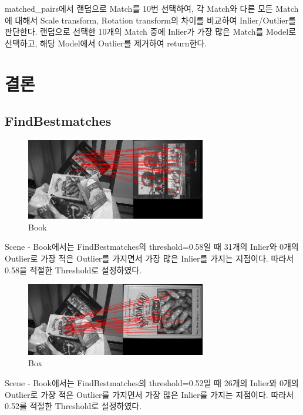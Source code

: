 \documentclass[]{report}
\begin{document}
matched\_pairs에서 랜덤으로 Match를 10번 선택하여,
각 Match와 다른 모든 Match에 대해서 Scale transform, Rotation transform의 차이를 비교하여 Inlier/Outlier를 판단한다.
랜덤으로 선택한 10개의 Match 중에 Inlier가 가장 많은 Match를 Model로 선택하고, 해당 Model에서 Outlier를 제거하여 return한다.\\


\chapter{결론}

\section{FindBestmatches}

\begin{figure}[ht!]
	\centering
	\includegraphics[width=0.7\textwidth]{image/3-1-book.png}
	\caption{Book}
	\label{3-1-book}
\end{figure}

Scene - Book에서는 FindBestmatches의 threshold=0.58일 때 31개의 Inlier와 0개의 Outlier로
가장 적은 Outlier를 가지면서 가장 많은 Inlier를 가지는 지점이다. 따라서 0.58을 적절한 Threshold로 설정하였다.\\

\begin{figure}[ht!]
	\centering
	\includegraphics[width=0.7\textwidth]{image/3-1-box.png}
	\caption{Box}
	\label{3-1-box}
\end{figure}

Scene - Book에서는 FindBestmatches의 threshold=0.52일 때 26개의 Inlier와 0개의 Outlier로
가장 적은 Outlier를 가지면서 가장 많은 Inlier를 가지는 지점이다. 따라서 0.52를 적절한 Threshold로 설정하였다.\\
\end{document}
